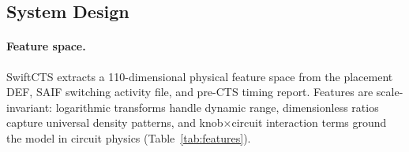 \documentclass[acmsmall,review,anonymous]{acmart}
\begin{document}
\subsection{System Design}
\label{sec:system_design}

\paragraph{Feature space.}
SwiftCTS extracts a 110-dimensional physical feature space from the
placement DEF, SAIF switching activity file, and pre-CTS timing report.
Features are scale-invariant: logarithmic transforms handle dynamic range,
dimensionless ratios capture universal density patterns, and
knob$\times$circuit interaction terms ground the model in circuit physics
(Table~\ref{tab:features}).

\begin{table}[htbp]
\centering
\fontsize{7pt}{8pt}\selectfont
\setlength{\tabcolsep}{3pt}
\caption{110-Dimensional Physical Feature Space \& Nomenclature.}
\label{tab:features}
\end{table}
\end{document}
